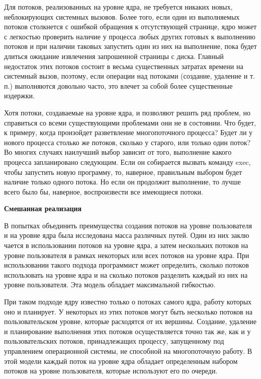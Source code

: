 Для потоков, реализованных на уровне ядра, не требуется никаких новых, неблокирующих системных вызовов. Более того, если один из выполняемых потоков столкнется с ошибкой обращения к отсутствующей странице, ядро может с легкостью проверить наличие у процесса любых других готовых к выполнению потоков и при наличии таковых запустить один из них на выполнение, пока будет длиться ожидание извлечения запрошенной страницы с диска. Главный недостаток этих потоков состоит в весьма существенных затратах времени на системный вызов, поэтому, если операции над потоками (создание, удаление и т. п.) выполняются довольно часто, это влечет за собой более существенные издержки.

Хотя потоки, создаваемые на уровне ядра, и позволяют решить ряд проблем, но справиться со всеми существующими проблемами они не в состоянии. Что будет, к примеру, когда произойдет разветвление многопоточного процесса? Будет ли у нового
процесса столько же потоков, сколько у старого, или только один поток? Во многих случаях наилучший выбор зависит от того, выполнение какого процесса запланировано следующим. Если он собирается вызвать команду exec, чтобы запустить новую программу, то, наверное, правильным выбором будет наличие только одного потока. Но если он продолжит выполнение, то лучше всего было бы, наверное, воспроизвести все имеющиеся потоки.

\textbf{Смешанная реализация}

В попытках объединить преимущества создания потоков на уровне пользователя и на
уровне ядра была исследована масса различных путей. Один из них заклю чается в использовании потоков на уровне ядра, а затем нескольких потоков на уровне пользователя в рамках некоторых или всех потоков на уровне ядра. При использовании такого подхода программист может определить, сколько потоков использовать на уровне ядра и на сколько потоков разделить каждый из них на уровне пользователя. Эта модель обладает максимальной гибкостью.

При таком подходе ядру известно только о потоках самого ядра, работу которых оно
и планирует. У некоторых из этих потоков могут быть несколько потоков на пользовательском уровне, которые расходятся от их вершины. Создание, удаление и планирование выполнения этих потоков осуществляется точно так же, как и у пользовательских
потоков, принадлежащих процессу, запущенному под управлением операционной
системы, не способной на многопоточную работу. В этой модели каждый поток на
уровне ядра обладает определенным набором потоков на уровне пользователя, которые
используют его по очереди.

